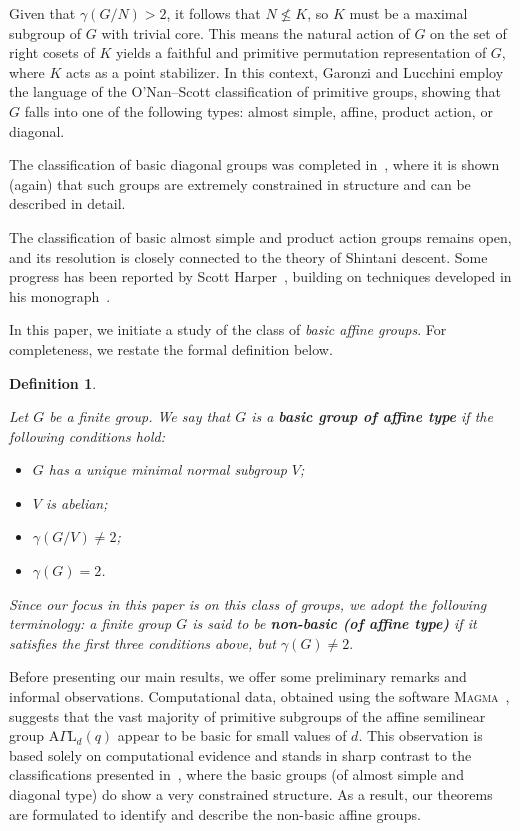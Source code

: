 \documentclass{amsart}
\newtheorem{definition}[theorem]{Definition}
\begin{document}
Given that $\gamma(G/N) > 2$, it follows that $N \nleq K$, so $K$ must be a maximal subgroup of $G$ with trivial core. This means the natural action of $G$ on the set of right cosets of $K$ yields a faithful and primitive permutation representation of $G$, where $K$ acts as a point stabilizer. In this context, Garonzi and Lucchini employ the language of the O'Nan–Scott classification of primitive groups, showing that $G$ falls into one of the following types: almost simple, affine, product action, or diagonal. 

The classification of basic diagonal groups was completed in~\cite{FPS}, where it is shown (again) that such groups are extremely constrained in structure and can be described in detail.

The classification of basic almost simple and product action groups remains open, and its resolution is closely connected to the theory of Shintani descent. Some progress has been reported by Scott Harper~\cite{scott}, building on techniques developed in his monograph~\cite{scott1}.

In this paper, we initiate a study of the class of \emph{basic affine groups}. For completeness, we restate the formal definition below.
\begin{definition}\label{der}{\rm
Let $G$ be a finite group. We say that $G$ is a \textit{\textbf{basic group of affine type}} if the following conditions hold:
\begin{itemize}
    \item $G$ has a unique minimal normal subgroup $V$;
    \item $V$ is abelian;
    \item $\gamma(G/V) \ne 2$;
    \item $\gamma(G) = 2$.
\end{itemize}
Since our focus in this paper is on this class of groups, we adopt the following terminology: a finite group $G$ is said to be \textbf{\textit{non-basic (of affine type)}} if it satisfies the first three conditions above, but $
\gamma(G) \ne 2.$}
\end{definition}

Before presenting our main results, we offer some preliminary remarks and informal observations. Computational data, obtained using the software \textsc{Magma}~\cite{magma}, suggests that the vast majority of primitive subgroups of the affine semilinear group $\mathrm{A}\Gamma\mathrm{L}_d(q)$ appear to be basic for small values of $d$. This observation is based solely on computational evidence and stands in sharp contrast to the classifications presented in~\cite{libro,FPS}, where the basic groups (of almost simple and diagonal type) do show a very constrained structure. As a result, our theorems are formulated to identify and describe the non-basic affine groups.
\end{document}

